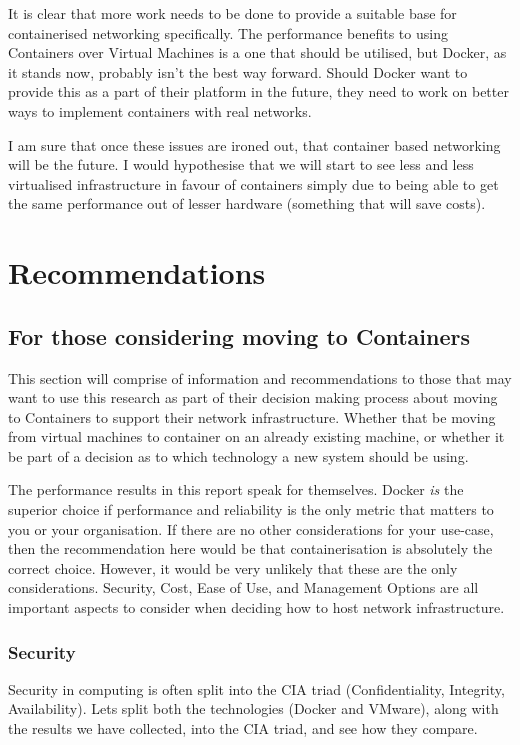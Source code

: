 It is clear that more work needs to be done to provide a suitable base for containerised networking specifically. The performance benefits to using Containers over Virtual Machines is a one that should be utilised, but Docker, as it stands now, probably isn't the best way forward. Should Docker want to provide this as a part of their platform in the future, they need to work on better ways to implement containers with real networks.

I am sure that once these issues are ironed out, that container based networking will be the future. I would hypothesise that we will start to see less and less virtualised infrastructure in favour of containers simply due to being able to get the same performance out of lesser hardware (something that will save costs).

\chapter{Recommendations}

\section{For those considering moving to Containers}
\label{sec:RecSMEs}
This section will comprise of information and recommendations to those that may want to use this research as part of their decision making process about moving to Containers to support their network infrastructure. Whether that be moving from virtual machines to container on an already existing machine, or whether it be part of a decision as to which technology a new system should be using.

The performance results in this report speak for themselves. Docker \emph{is} the superior choice if performance and reliability is the only metric that matters to you or your organisation. If there are no other considerations for your use-case, then the recommendation here would be that containerisation is absolutely the correct choice. However, it would be very unlikely that these are the only considerations. Security, Cost, Ease of Use, and Management Options are all important aspects to consider when deciding how to host network infrastructure.
\subsection{Security}
\label{conclandreccoSecurity}
Security in computing is often split into the CIA triad (Confidentiality, Integrity, Availability). Lets split both the technologies (Docker and VMware), along with the results we have collected, into the CIA triad, and see how they compare.
